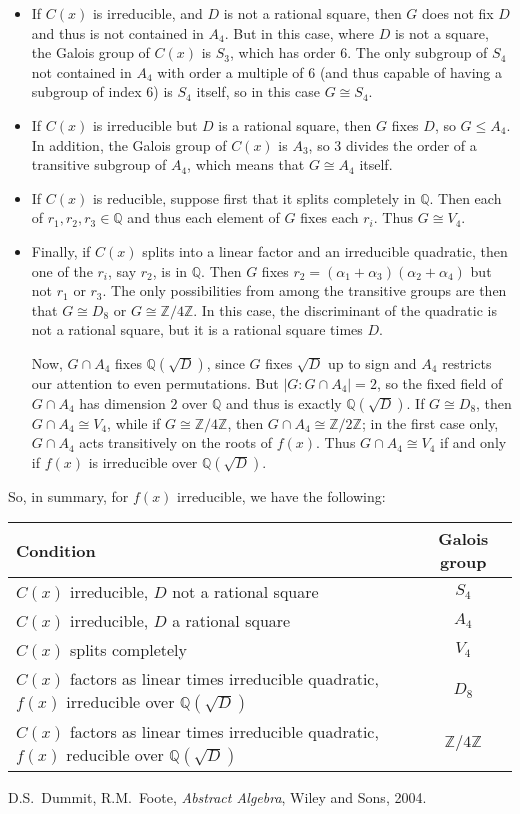 \documentclass[12pt]{article}
\newcommand{\Order}[1]{\lvert #1 \rvert}
\newcommand{\Rats}{\mathbb{Q}}
\newcommand{\Ints}{\mathbb{Z}}
\newcommand{\subgroup}{\leq}
\begin{document}
\begin{itemize}

\item If $C(x)$ is irreducible, and $D$ is not a rational square, then $G$ does not fix $D$ and thus is not contained in $A_4$. But in this case, where $D$ is not a square, the Galois group of $C(x)$ is $S_3$, which has order $6$. The only subgroup of $S_4$ not contained in $A_4$ with order a multiple of $6$ (and thus capable of having a subgroup of index $6$) is $S_4$ itself, so in this case $G\cong S_4$.

\item If $C(x)$ is irreducible but $D$ is a rational square, then $G$ fixes $D$, so $G\subgroup A_4$. In addition, the Galois group of $C(x)$ is $A_3$, so $3$ divides the order of a transitive subgroup of $A_4$, which means that $G\cong A_4$ itself.

\item If $C(x)$ is reducible, suppose first that it splits completely in $\Rats$. Then each of $r_1,r_2,r_3\in \Rats$ and thus each element of $G$ fixes each $r_i$. Thus $G\cong V_4$.

\item Finally, if $C(x)$ splits into a linear factor and an irreducible quadratic, then one of the $r_i$, say $r_2$, is in $\Rats$. Then $G$ fixes $r_2=(\alpha_1+\alpha_3)(\alpha_2+\alpha_4)$ but not $r_1$ or $r_3$. The only possibilities from among the transitive groups are then that $G\cong D_8$ or $G\cong \Ints/4\Ints$. In this case, the discriminant of the quadratic is not a rational square, but it is a rational square times $D$.

Now, $G\cap A_4$ fixes $\Rats(\sqrt{D})$, since $G$ fixes $\sqrt{D}$ up to sign and $A_4$ restricts our attention to even permutations. But $\Order{G:G\cap A_4}=2$, so the fixed field of $G\cap A_4$ has dimension $2$ over $\Rats$ and thus is exactly $\Rats(\sqrt{D})$. If $G\cong D_8$, then $G\cap A_4\cong V_4$, while if $G\cong \Ints/4\Ints$, then $G\cap A_4\cong \Ints/2\Ints$; in the first case only, $G\cap A_4$ acts transitively on the roots of $f(x)$. Thus $G\cap A_4\cong V_4$ if and only if $f(x)$ is irreducible over $\Rats(\sqrt{D})$.
\end{itemize}

So, in summary, for $f(x)$ irreducible, we have the following:
\begin{center}
\begin{tabular}{lc}
Condition & Galois group\\
\hline
$C(x)$ irreducible, $D$ not a rational square & $S_4$\\
$C(x)$ irreducible, $D$ a rational square & $A_4$\\
$C(x)$ splits completely & $V_4$\\
$C(x)$ factors as linear times irreducible quadratic, $f(x)$ irreducible over $\Rats(\sqrt{D})$ & $D_8$\\
$C(x)$ factors as linear times irreducible quadratic, $f(x)$ reducible over $\Rats(\sqrt{D})$ & $\Ints/4\Ints$
\end{tabular}
\end{center}

\begin{thebibliography}{10}
D.S.~Dummit, R.M.~Foote, \emph{Abstract Algebra}, Wiley and Sons, 2004.
\end{thebibliography}
\end{document}
